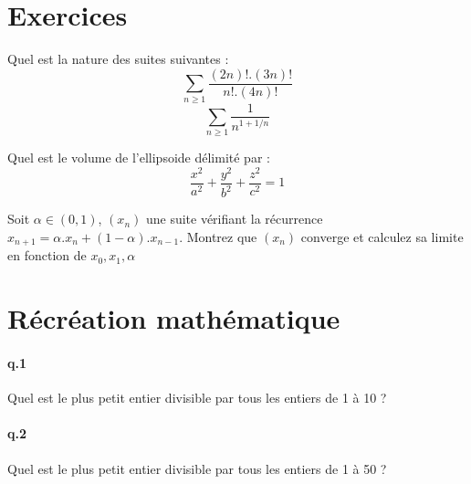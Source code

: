 \documentclass[10pt,a4paper]{article}
\begin{document}
\section{Exercices}
Quel est la nature des suites suivantes :
$$\sum_{n\geq 1} \frac{(2n)!.(3n)!}{n!.(4n)!}$$
$$\sum_{n\geq 1} \frac{1}{n^{1+1/n}}$$

Quel est le volume de l'ellipsoide délimité par : 
$$\frac{x^2}{a^2}+\frac{y^2}{b^2}+\frac{z^2}{c^2}=1$$

Soit $\alpha \in (0,1)$, $(x_n)$ une suite vérifiant la récurrence 
$x_{n+1}= \alpha.x_n+(1-\alpha).x_{n-1}$.
Montrez que $(x_n)$ converge et calculez sa limite en fonction de
$x_0,x_1,\alpha$


\section{Récréation mathématique}
\paragraph{q.1}Quel est le plus petit entier divisible par tous les entiers de 1 à 10 ?
\paragraph{q.2}Quel est le plus petit entier divisible par tous les entiers de 1 à 50 ?
\end{document}
